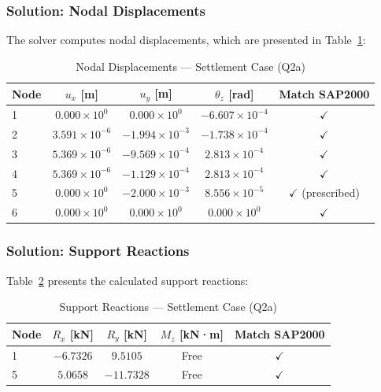 \documentclass[12pt,a4paper]{article}
\begin{document}
\subsubsection{Solution: Nodal Displacements}

The solver computes nodal displacements, which are presented in Table~\ref{tab:settlement_displacements}:

\begin{table}[H]
    \centering
    \caption{Nodal Displacements --- Settlement Case (Q2a)}
    \label{tab:settlement_displacements}
    \begin{tabular}{lcccc}
        \toprule
        \textbf{Node} & \textbf{$u_x$ [m]} & \textbf{$u_y$ [m]} & \textbf{$\theta_z$ [rad]} & \textbf{Match SAP2000} \\
        \midrule
        1 & $0.000\times10^{0}$  & $0.000\times10^{0}$   & $-6.607\times10^{-4}$ & $\checkmark$ \\
        2 & $3.591\times10^{-6}$ & $-1.994\times10^{-3}$ & $-1.738\times10^{-4}$ & $\checkmark$ \\
        3 & $5.369\times10^{-6}$ & $-9.569\times10^{-4}$ & $2.813\times10^{-4}$  & $\checkmark$ \\
        4 & $5.369\times10^{-6}$ & $-1.129\times10^{-4}$ & $2.813\times10^{-4}$  & $\checkmark$ \\
        5 & $0.000\times10^{0}$  & $-2.000\times10^{-3}$ & $8.556\times10^{-5}$  & $\checkmark$ (prescribed) \\
        6 & $0.000\times10^{0}$  & $0.000\times10^{0}$   & $0.000\times10^{0}$   & $\checkmark$ \\
        \bottomrule
    \end{tabular}
\end{table}

\subsubsection{Solution: Support Reactions}

Table~\ref{tab:settlement_reactions} presents the calculated support reactions:

\begin{table}[H]
    \centering
    \caption{Support Reactions --- Settlement Case (Q2a)}
    \label{tab:settlement_reactions}
    \begin{tabular}{lcccc}
        \toprule
        \textbf{Node} & \textbf{$R_x$ [kN]} & \textbf{$R_y$ [kN]} & \textbf{$M_z$ [kN·m]} & \textbf{Match SAP2000} \\
        \midrule
        1 & $-6.7326$ & $9.5105$  & Free & $\checkmark$ \\
        5 & $5.0658$  & $-11.7328$ & Free & $\checkmark$ \\
        \bottomrule
    \end{tabular}
\end{table}
\end{document}
